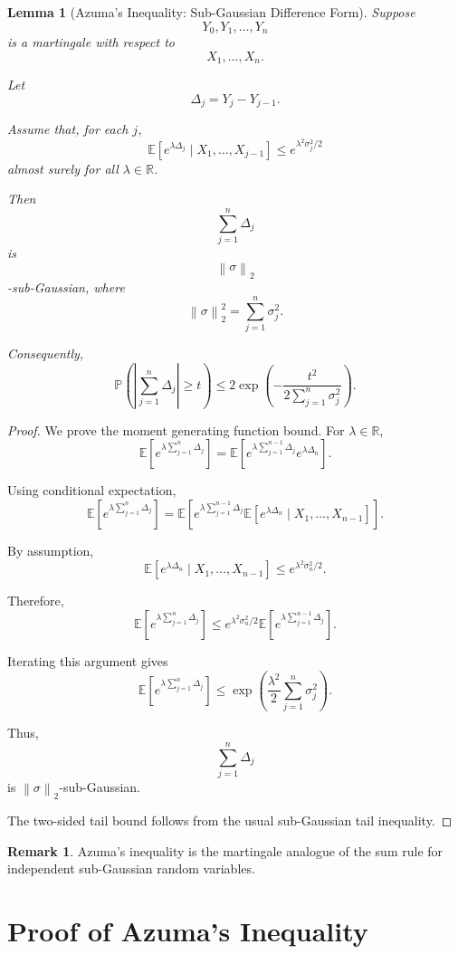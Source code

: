 \documentclass[12pt,oneside]{book}
\numberwithin{equation}{section}
\theoremstyle{definition}
\newtheorem{remark}{Remark}[section]
\theoremstyle{plain}
\newtheorem{lemma}{Lemma}[section]
\theoremstyle{remark}
\newcommand{\R}{\mathbb{R}}
\newcommand{\E}{\mathbb{E}}
\newcommand{\Prob}{\mathbb{P}}
\newcommand{\norm}[1]{\left\lVert #1 \right\rVert}
\begin{document}
\begin{lemma}[Azuma's Inequality: Sub-Gaussian Difference Form]
Suppose
\[
Y_0,Y_1,\dots,Y_n
\]
is a martingale with respect to
\[
X_1,\dots,X_n.
\]

Let
\[
\Delta_j=Y_j-Y_{j-1}.
\]

Assume that, for each $j$,
\[
\E\left[
e^{\lambda \Delta_j}
\mid
X_1,\dots,X_{j-1}
\right]
\leq
e^{\lambda^2\sigma_j^2/2}
\]
almost surely for all $\lambda\in\R$.

Then
\[
\sum_{j=1}^n \Delta_j
\]
is
\[
\norm{\sigma}_2
\]
-sub-Gaussian, where
\[
\norm{\sigma}_2^2
=
\sum_{j=1}^n \sigma_j^2.
\]

Consequently,
\[
\Prob\left(
\left|
\sum_{j=1}^n \Delta_j
\right|
\geq t
\right)
\leq
2\exp\left(
-\frac{t^2}{2\sum_{j=1}^n \sigma_j^2}
\right).
\]
\end{lemma}

\begin{proof}
We prove the moment generating function bound. For $\lambda\in\R$,
\[
\E\left[
e^{\lambda\sum_{j=1}^n \Delta_j}
\right]
=
\E\left[
e^{\lambda\sum_{j=1}^{n-1} \Delta_j}
e^{\lambda\Delta_n}
\right].
\]

Using conditional expectation,
\[
\E\left[
e^{\lambda\sum_{j=1}^n \Delta_j}
\right]
=
\E\left[
e^{\lambda\sum_{j=1}^{n-1} \Delta_j}
\E\left[
e^{\lambda\Delta_n}
\mid
X_1,\dots,X_{n-1}
\right]
\right].
\]

By assumption,
\[
\E\left[
e^{\lambda\Delta_n}
\mid
X_1,\dots,X_{n-1}
\right]
\leq
e^{\lambda^2\sigma_n^2/2}.
\]

Therefore,
\[
\E\left[
e^{\lambda\sum_{j=1}^n \Delta_j}
\right]
\leq
e^{\lambda^2\sigma_n^2/2}
\E\left[
e^{\lambda\sum_{j=1}^{n-1}\Delta_j}
\right].
\]

Iterating this argument gives
\[
\E\left[
e^{\lambda\sum_{j=1}^n \Delta_j}
\right]
\leq
\exp\left(
\frac{\lambda^2}{2}\sum_{j=1}^n\sigma_j^2
\right).
\]

Thus,
\[
\sum_{j=1}^n \Delta_j
\]
is $\norm{\sigma}_2$-sub-Gaussian.

The two-sided tail bound follows from the usual sub-Gaussian tail inequality.
\end{proof}

\begin{remark}
Azuma's inequality is the martingale analogue of the sum rule for independent sub-Gaussian random variables.
\end{remark}

\section{Proof of Azuma's Inequality}
\end{document}

